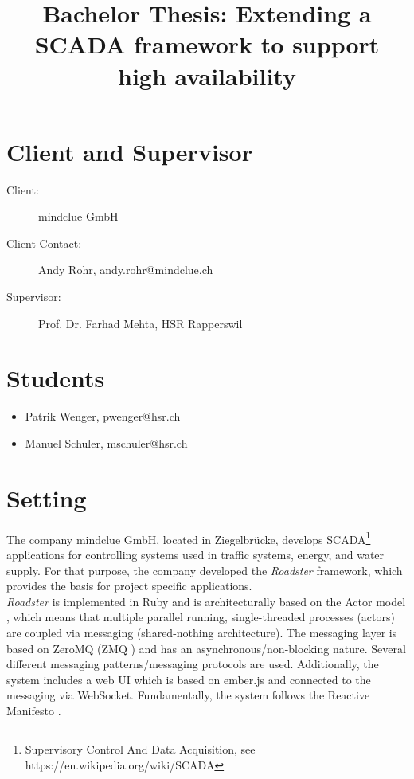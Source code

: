\documentclass[a4paper]{article}
\title{Bachelor Thesis: Extending a SCADA framework to support high availability}
\date{} %
\begin{document}
\lstset{language=ruby}
\pagestyle{fancyplain}
\fancyhf{}
\setlength{\headheight}{50pt}
\maketitle
{}

\section{Client and Supervisor}
\begin{description}
	\item [Client:] mindclue GmbH
	\item [Client Contact:] Andy Rohr, andy.rohr@mindclue.ch
	\item [Supervisor:] Prof. Dr. Farhad Mehta, HSR Rapperswil
\end{description}


\section{Students}
\begin{itemize}
	\item Patrik Wenger, pwenger@hsr.ch
	\item Manuel Schuler, mschuler@hsr.ch
\end{itemize}

\section{Setting}
The company mindclue GmbH, located in Ziegelbrücke, develops
SCADA\footnote{Supervisory Control And Data Acquisition, see
https://en.wikipedia.org/wiki/SCADA} applications for controlling systems used
in traffic systems, energy, and water supply. For that purpose, the company
developed the \emph{Roadster} framework, which provides the basis for project
specific applications.\\

\emph{Roadster} is implemented in Ruby and is architecturally based on the
Actor model \cite{wiki:actor-model}, which means that multiple parallel running,
single-threaded processes (actors) are coupled via messaging (shared-nothing
architecture). The messaging layer is based on ZeroMQ (ZMQ \cite{zeromq}) and
has an asynchronous/non-blocking nature. Several different messaging
patterns/messaging protocols are used. Additionally, the system includes a web
UI which is based on ember.js and connected to the messaging via WebSocket.
Fundamentally, the system follows the Reactive Manifesto
\cite{reactivemanifesto}.\\
\end{document}
